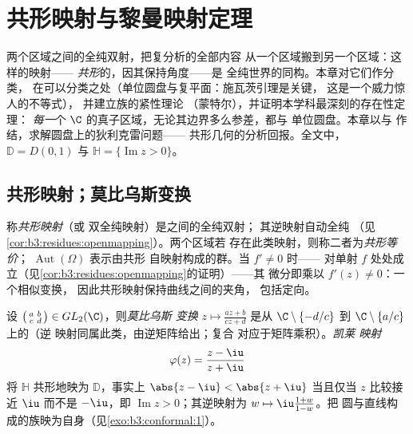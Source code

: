 \chapter{共形映射与黎曼映射定理}
\label{ch:b3:conformal}

两个区域之间的全纯双射，把复分析的全部内容
从一个区域搬到另一个区域：这样的映射——
\emph{共形}的，因其保持角度——是
全纯世界的同构。本章对它们作分类，
在可以分类之处（单位圆盘与复平面：施瓦茨引理是关键，
这是一个威力惊人的不等式），
并建立族的紧性理论
（蒙特尔），并证明本学科最深刻的存在性定理：
\emph{每一}个
$\C$ 的真子区域，无论其边界多么参差，都与
单位圆盘。本章以与
作结，求解圆盘上的狄利克雷问题——
共形几何的分析回报。全文中，
$\mathbb D = D(0,1)$ 与 $\mathbb H = \{\operatorname{Im}z >
0\}$。

\section{共形映射；莫比乌斯变换}

\begin{definition}\label{def:b3:conformal:conformal}
称\emph{共形映射}（或
双全纯映射）是之间的全纯双射；
其逆映射自动全纯
（见\cref{cor:b3:residues:openmapping}）。两个区域若
存在此类映射，则称二者为\emph{共形等价}；
$\operatorname{Aut}(\Omega)$ 表示由共形
自映射构成的群。当 $f' \neq 0$ 时——
对单射 $f$ 处处成立（见\cref{cor:b3:residues:openmapping}的证明）——其
微分即乘以 $f'(z) \neq 0$：一个相似变换，
因此共形映射保持曲线之间的夹角，
包括定向。
\end{definition}

\begin{example}[莫比乌斯变换]
\label{ex:b3:conformal:mobius}
设 $\bigl(\begin{smallmatrix}a & b\\ c &
d\end{smallmatrix}\bigr) \in GL_2(\C)$，则\emph{莫比乌斯
变换} $z \mapsto
\frac{az + b}{cz + d}$ 是从
$\C\setminus\{-d/c\}$ 到 $\C\setminus\{a/c\}$ 上的（逆
映射同属此类，由逆矩阵给出；复合
对应于矩阵乘积）。\emph{凯莱
映射}
\[
\varphi(z) = \frac{z - \iu}{z + \iu}
\]
将 $\mathbb H$ 共形地映为 $\mathbb D$，事实上 $\abs{z
- \iu} < \abs{z + \iu}$ 当且仅当 $z$ 比较接近 $\iu$
而不是 $-\iu$，即 $\operatorname{Im}z > 0$；其逆映射为
$w \mapsto \iu\frac{1 + w}{1 - w}$。把
圆与直线构成的族映为自身（见\cref{exo:b3:conformal:1}）。
\end{example}

